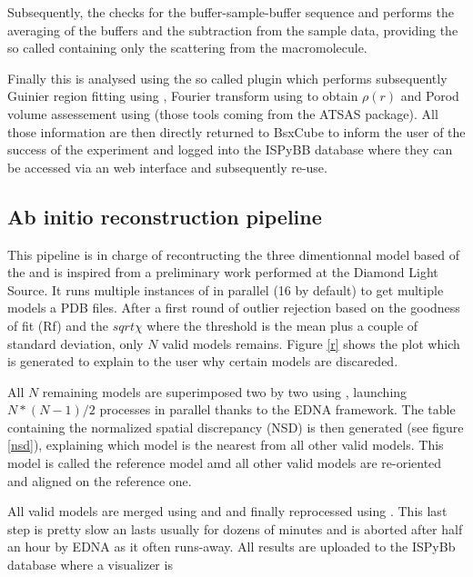 \documentclass[preprint]{iucr}              %
\begin{document}
Subsequently, the  checks for the buffer-sample-buffer
sequence and performs the averaging of the buffers and the subtraction from the
sample data, providing the so called  containing only
the scattering from the macromolecule.

Finally this  is analysed using the so called
 plugin which performs  subsequently Guinier region fitting
using , Fourier transform using  to obtain
$\rho(r)$ and Porod volume assessement using  (those tools
coming from the ATSAS package).
All those information are then directly returned to BsxCube to inform the user
of the success of the experiment and logged into the ISPyBB
database\cite{ispybb} where they can be accessed via an web interface and 
subsequently re-use.

\subsection{Ab initio reconstruction pipeline}

This pipeline is in charge of recontructing the three dimentionnal model based
of the  and is inspired from a preliminary work
performed at the Diamond Light Source.
It runs multiple instances of  in parallel (16 by default) to get
multiple models a PDB files. 
After a first
round of outlier rejection based on the goodness of fit (Rf) and the
$sqrt{\chi}$  where the threshold is the mean plus a couple of standard
deviation, only $N$ valid models remains. 
Figure \ref{r} shows the plot which is generated to
explain to the user why certain models are discareded.

All $N$ remaining models are superimposed two by two using
\cite{supcomb}, launching $N*(N-1)/2$ processes in parallel
thanks to the EDNA framework.
The table containing the normalized spatial discrepancy (NSD) is then generated
(see figure \ref{nsd}), explaining which model is the nearest from all other
valid models. This model is called the reference model amd all other valid
models are re-oriented and aligned on the reference one.

All valid models are merged using \cite{damaver} and
 and finally reprocessed using \cite{damin}.
This last step is pretty slow an lasts usually for dozens of minutes and is
aborted after half an hour by EDNA as it often runs-away. All results are
uploaded to the ISPyBb database where a visualizer is 
\end{document}
